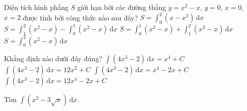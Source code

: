 \begin{ex}%
	Diện tích hình phẳng $S$ giới hạn bởi các đường thẳng $ y=x^2-x$, $y=0$, $x=0$, $x=2$ được  tính bởi công thức nào sau đây?
	\choice 
		{$ S=\displaystyle\int_0^2\left(x-x^2\right)\mathrm{\,d}x$} 
		{\True  $S=\displaystyle\int_1^2\left(x^2-x\right)-\displaystyle\int_0^1\left(x^2-x\right)\mathrm{\,d}x$}
		{$ S=\displaystyle\int_0^1\left(x^2-x\right)+\displaystyle\int_1^2\left(x^2-x\right)\mathrm{\,d}x$} 
		{$  S=\displaystyle\int_0^2\left(x^2-x\right)\mathrm{\,d}x$}
\end{ex}

\begin{ex}%
	Khẳng định nào dưới đây đúng? 
	\choice 
		 {$\displaystyle \int\left(4 x^3-2\right)\mathrm{\,d}x=x^4+C$}
		 {$\displaystyle \int\left(4 x^3-2\right)\mathrm{\,d}x=12 x^2+C$}
		{\True  $\displaystyle \int\left(4 x^3-2\right)\mathrm{\,d}x=x^4-2 x+C$}
		{$\displaystyle \int\left(4  x^3-2\right)\mathrm{\,d}x=12 x^4-2 x+C$}
\end{ex}

\begin{bt}%
	 Tìm $\displaystyle\int\left( x^2-3\sqrt{x}\right) \mathrm{\,d}x$.
\end{bt}


